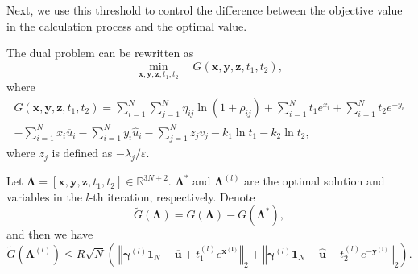 \documentclass[review,hidelinks,onefignum,onetabnum]{siamart220329}
\begin{document}
Next, we use this threshold to control the difference between the objective value in the calculation process and the optimal value.
\begin{lemma}
The dual problem can be rewritten as
 $$\min_{\bm{x},\bm{y},\bm{z},t_1,t_2}\quad G(\bm{x},\bm{y},\bm{z},t_1,t_2),$$
 where
 \begin{multline*}
          G(\bm{x},\bm{y},\bm{z},t_1,t_2)= \sum_{i=1}^{N}\sum_{j=1}^{N} \eta_{ij}\ln\left(1+\rho_{ij}\right)+\sum_{i=1}^{N} t_1 e^{x_{i}}+ \sum_{i=1}^{N} t_2 e^{-y_{i}}\\
          -\sum_{i=1}^{N} x_{i} \overline{u}_i- \sum_{i=1}^{N} y_{i} \hat{u}_i-\sum_{j=1}^{N}z_j v_j -k_1 \ln t_1 -k_2 \ln t_2, 
 \end{multline*}
where $z_j$ is defined as $-\lambda_j / \varepsilon$. 

Let $\bm{\Lambda} = \left[ \bm{x},\bm{y},\bm{z},t_1,t_2 \right] \in \mathbb{R}^{3N + 2}$. $\bm{\Lambda}^{*}$ and $\bm{\Lambda}^{(l)}$ are the optimal solution and variables in the $l$-th iteration, respectively. Denote
 $$\widetilde{G}(\bm{\Lambda})=G(\bm{\Lambda})-G(\bm{\Lambda}^{*}),$$
 and then we have
 \begin{equation*}
    \widetilde{G}(\bm{\Lambda}^{(l)})\leq 
    R \sqrt{N}\left( \ \left\Vert \bm{\gamma}^{(l)}\bm{1}_N-\bm{\overline{u}}+t_1 ^{(l)}e^{\bm{x^{(l)}}}\right\Vert_2
    +\left\Vert \bm{\gamma}^{(l)}\bm{1}_N-\bm{\hat{u}}-t_2^{(l)} e^{\bm{-y^{(l)}}}\right\Vert_2\right). 
\end{equation*}
\end{lemma}
\end{document}
